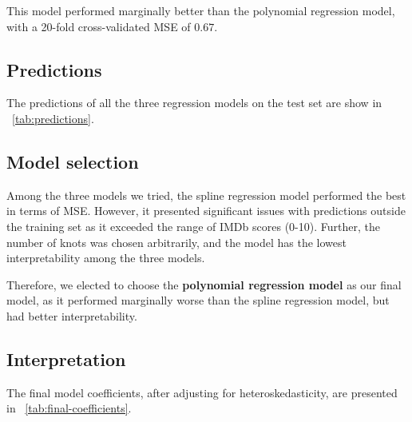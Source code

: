 \documentclass[12pt,a4paper]{article}
\begin{document}
This model performed marginally better than the polynomial regression model, with a 20-fold cross-validated MSE of $0.67$.

\subsection{Predictions}\label{subsec:predictions}
The predictions of all the three regression models on the test set are show in \tablename~\ref{tab:predictions}.

\subsection{Model selection}\label{subsec:model-selection}
Among the three models we tried, the spline regression model performed the best in terms of MSE.
However, it presented significant issues with predictions outside the training set as it exceeded the range of IMDb scores (0-10).
Further, the number of knots was chosen arbitrarily, and the model has the lowest interpretability among the three models.

Therefore, we elected to choose the \textbf{polynomial regression model} as our final model, as it performed marginally worse than the spline regression model, but had better interpretability.

\subsection{Interpretation}\label{subsec:interpretation}
The final model coefficients, after adjusting for heteroskedasticity, are presented in \tablename~\ref{tab:final-coefficients}.
\end{document}
